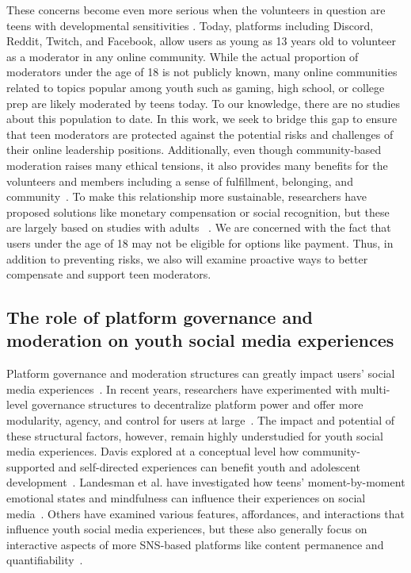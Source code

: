 These concerns become even more serious when the volunteers in question are teens with developmental sensitivities \cite{orben2022windows}. Today, platforms including Discord, Reddit, Twitch, and Facebook, allow users as young as 13 years old to volunteer as a moderator in any online community. While the actual proportion of moderators under the age of 18 is not publicly known, many online communities related to topics popular among youth such as gaming, high school, or college prep are likely moderated by teens today. To our knowledge, there are no studies about this population to date. In this work, we seek to bridge this gap to ensure that teen moderators are protected against the potential risks and challenges of their online leadership positions. Additionally, even though community-based moderation raises many ethical tensions, it also provides many benefits for the volunteers and members including a sense of fulfillment, belonging, and community~\cite{seering2022pride}. To make this relationship more sustainable, researchers have proposed solutions like monetary compensation or social recognition, but these are largely based on studies with adults ~\cite{dosono2019moderation,li2022measuring, chang2011social}. We are concerned with the fact that users under the age of 18 may not be eligible for options like payment. Thus, in addition to preventing risks, we also will examine proactive ways to better compensate and support teen moderators.

\subsection{The role of platform governance and moderation on youth social media experiences}
Platform governance and moderation structures can greatly impact users' social media experiences~\cite{zhang_form_2024}. In recent years, researchers have experimented with multi-level governance structures to decentralize platform power and offer more modularity, agency, and control for users at large~\cite{jhaver_decentralizing_2023}. The impact and potential of these structural factors, however, remain highly understudied for youth social media experiences. Davis explored at a conceptual level how community-supported and self-directed experiences can benefit youth and adolescent development~\cite{davis2023technologys}. Landesman et al. have investigated how teens' moment-by-moment emotional states and mindfulness can influence their experiences on social media~\cite{landesman2024care}. 
Others have examined various features, affordances, and interactions that influence youth social media experiences, but these also generally focus on interactive aspects of more SNS-based platforms like content permanence and quantifiability~\cite{nesi_transformation_2018,nesi_transformation_2018_2}. 

